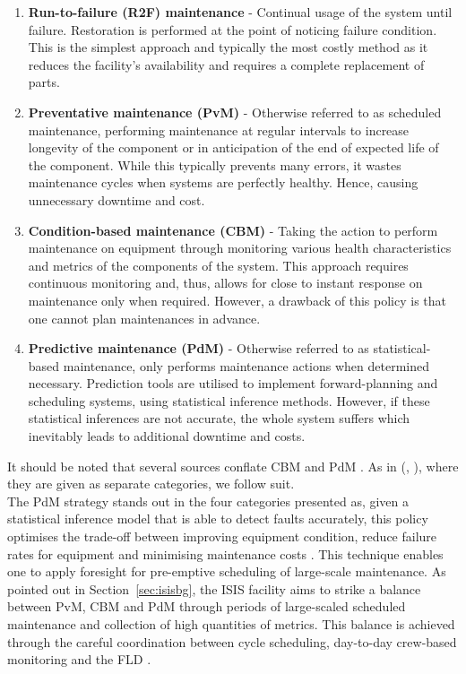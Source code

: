 \documentclass[10pt,oneside]{report}
\renewcommand{\citet}[1]{\citeauthor{#1}, \citeyear{#1}}
\begin{document}
\begin{enumerate}
    \item{\textbf{Run-to-failure (R2F) maintenance} - Continual usage of the system until failure. Restoration is performed at the point of noticing failure condition. This is the simplest approach and typically the most costly method as it reduces the facility's availability and requires a complete replacement of parts.} 
    \item{\textbf{Preventative maintenance (PvM)} - Otherwise referred to as scheduled maintenance, performing maintenance at regular intervals to increase longevity of the component or in anticipation of the end of expected life of the component. While this typically prevents many errors, it wastes maintenance cycles when systems are perfectly healthy. Hence, causing unnecessary downtime and cost.}
    \item{\textbf{Condition-based maintenance (CBM)} - Taking the action to perform maintenance on equipment through monitoring various health characteristics and metrics of the components of the system. This approach requires continuous monitoring and, thus, allows for close to instant response on maintenance only when required. However, a drawback of this policy is that one cannot plan maintenances in advance.}
    \item{\textbf{Predictive maintenance (PdM)} - Otherwise referred to as statistical-based maintenance, only performs maintenance actions when determined necessary. Prediction tools are utilised to implement forward-planning and scheduling systems, using statistical inference methods. However, if these statistical inferences are not accurate, the whole system suffers which inevitably leads to additional downtime and costs.}
\end{enumerate}
It should be noted that several sources conflate CBM and PdM \cite{mobley2002introduction}. As in (\citet{susto2012predictive}), where they are given as separate categories, we follow suit. \\ 

The PdM strategy stands out in the four categories presented as, given a statistical inference model that is able to detect faults accurately, this policy optimises the trade-off between improving equipment condition, reduce failure rates for equipment and minimising maintenance costs \cite{carvalho2019systematic}. This technique enables one to apply foresight for pre-emptive scheduling of large-scale maintenance. As pointed out in Section~\ref{sec:isisbg}, the ISIS facility aims to strike a balance between PvM, CBM and PdM through periods of large-scaled scheduled maintenance and collection of high quantities of metrics. This balance is achieved through the careful coordination between cycle scheduling, day-to-day crew-based monitoring and the FLD \cite{thomason2019isis}.
\end{document}

